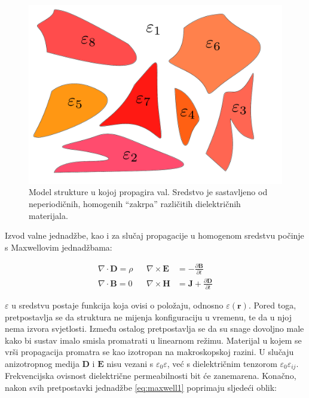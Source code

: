 \documentclass[utf8, seminar]{fer}
\begin{document}
\begin{figure}
	\centering
	\includegraphics[width = 1.0\linewidth]{./images/structure-model.pdf}
	\caption{Model strukture u kojoj propagira val. Sredstvo je sastavljeno od
	neperiodičnih, homogenih ``zakrpa'' različitih dielektričnih materijala.}
	\label{fig:structure}
\end{figure}

Izvod valne jednadžbe, kao i za slučaj propagacije u homogenom sredstvu počinje
s Maxwellovim jednadžbama:

\begin{align} \label{eq:maxwell1}
	\nabla \cdot \mathbf{D} = \rho &&
	\nabla \times \mathbf{E} &=
		- \frac{\partial \mathbf{B}}{\partial t}  \nonumber \\
	\nabla \cdot \mathbf{B} = 0 &&
	\nabla \times \mathbf{H} &=
		\mathbf{J} + \frac{\partial \mathbf{D}}{\partial t}
\end{align}

$\varepsilon$ u sredstvu postaje funkcija koja ovisi o položaju, odnosno
$\varepsilon(\mathbf{r})$. Pored toga, pretpostavlja se da struktura ne mijenja
konfiguraciju u vremenu, te da u njoj nema izvora svjetlosti. Između ostalog
pretpostavlja se da su snage dovoljno male kako bi sustav imalo smisla promatrati
u linearnom režimu.
Materijal u kojem se vrši propagacija promatra se kao izotropan na makroskopskoj
razini. U slučaju anizotropnog medija $\mathbf{D}$ i $\mathbf{E}$ nisu vezani
s $\varepsilon_0 \varepsilon$, već s
dielektričnim tenzorom $\varepsilon_0 \varepsilon_{ij}$. Frekvencijska
ovisnost dielektrične permeabilnosti bit će zanemarena. Konačno, nakon svih
pretpostavki jednadžbe \ref{eq:maxwell1} poprimaju sljedeći oblik:
\end{document}
